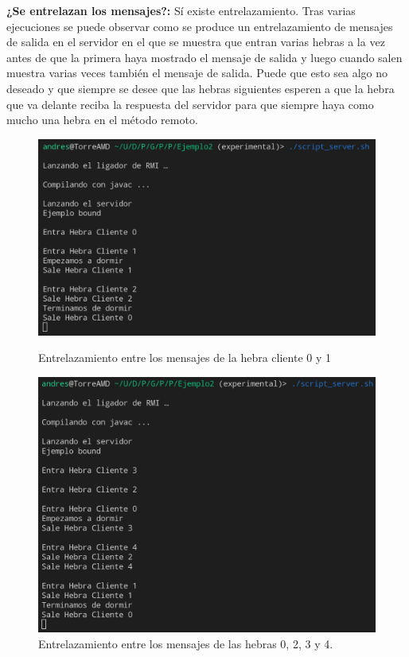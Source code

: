 \documentclass{article}
\begin{document}
\bigskip

\textbf{¿Se entrelazan los mensajes?: }Sí existe entrelazamiento. Tras varias ejecuciones se puede observar como se produce un entrelazamiento de mensajes de salida en el servidor en el que se muestra que entran varias hebras a la vez antes de que la primera haya mostrado el mensaje de salida y luego cuando salen muestra varias veces también el mensaje de salida. Puede que esto sea algo no deseado y que siempre se desee que las hebras siguientes esperen a que la hebra que va delante reciba la respuesta del servidor para que siempre haya como mucho una hebra en el método remoto.


\begin{figure}[H]
    \centering
    \begin{minipage}[H]{0.45\textwidth}
        \centering
        \includegraphics[width=\textwidth]{imagenes/E2Server1.png}
        \caption{Entrelazamiento entre los mensajes de la hebra cliente 0 y 1}
    \end{minipage}
    \hfill
    \begin{minipage}[H]{0.45\textwidth}
        \centering
        \includegraphics[width=\textwidth]{imagenes/E2Server2.png}
        \caption{Entrelazamiento entre los mensajes de las hebras 0, 2, 3 y 4.}
    \end{minipage}
\end{figure}
\end{document}

